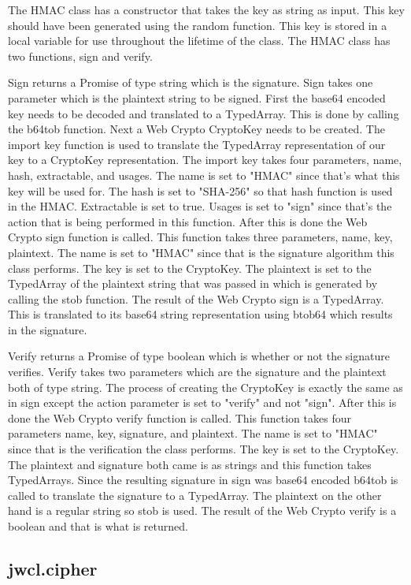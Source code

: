 The HMAC class has a constructor that takes the key as string as input. This key should have been generated using the random function. This key is stored in a local variable for use throughout the lifetime of the class. The HMAC class has two functions, sign and verify.


Sign returns a Promise of type string which is the signature. Sign takes one parameter which is the plaintext string to be signed. First the base64 encoded key needs to be decoded and translated to a TypedArray. This is done by calling the b64tob function. Next a Web Crypto CryptoKey needs to be created. The import key function is used to translate the TypedArray representation of our key to a CryptoKey representation. The import key takes four parameters, name, hash, extractable, and usages. The name is set to "HMAC" since that's what this key will be used for. The hash is set to "SHA-256" so that hash function is used in the HMAC. Extractable is set to true. Usages is set to "sign" since that's the action that is being performed in this function. After this is done the Web Crypto sign function is called. This function takes three parameters, name, key, plaintext. The name is set to "HMAC" since that is the signature algorithm this class performs. The key is set to the CryptoKey. The plaintext is set to the TypedArray of the plaintext string that was passed in which is generated by calling the stob function. The result of the Web Crypto sign is a TypedArray. This is translated to its base64 string representation using btob64 which results in the signature.

Verify returns a Promise of type boolean which is whether or not the signature verifies. Verify takes two parameters which are the signature and the plaintext both of type string. The process of creating the CryptoKey is exactly the same as in sign except the action parameter is set to "verify" and not "sign". After this is done the Web Crypto verify function is called. This function takes four parameters name, key, signature, and plaintext. The name is set to "HMAC" since that is the verification the class performs. The key is set to the CryptoKey. The plaintext and signature both came is as strings and this function takes TypedArrays. Since the resulting signature in sign was base64 encoded b64tob is called to translate the signature to a TypedArray. The plaintext on the other hand is a regular string so stob is used. The result of the Web Crypto verify is a boolean and that is what is returned.


\subsection{jwcl.cipher}



